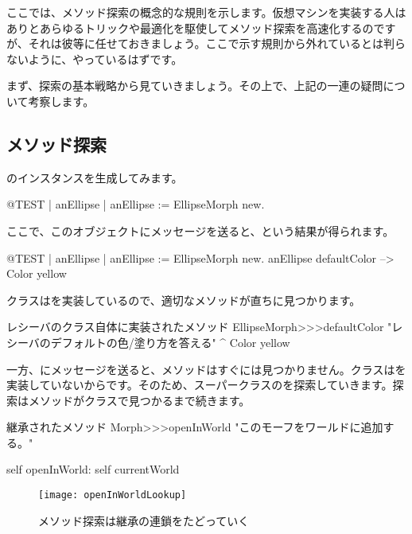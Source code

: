 \documentclass[a4paper,10pt,twoside]{book}
\begin{document}
ここでは、メソッド探索の概念的な規則を示します。仮想マシンを実装する人はありとあらゆるトリックや最適化を駆使してメソッド探索を高速化するのですが、それは彼等に任せておきましょう。ここで示す規則から外れているとは判らないように、やっているはずです。

まず、探索の基本戦略から見ていきましょう。その上で、上記の一連の疑問について考察します。

\subsection{メソッド探索}
のインスタンスを生成してみます。
\begin{code}{@TEST | anEllipse |}
anEllipse := EllipseMorph new.
\end{code}
\noindent
ここで、このオブジェクトにメッセージを送ると、という結果が得られます。
\begin{code}{@TEST | anEllipse | anEllipse := EllipseMorph new.}
anEllipse defaultColor --> Color yellow
\end{code}
\noindent
{}クラスはを実装しているので、適切なメソッドが直ちに見つかります。

\begin{method}[defaultColor]{レシーバのクラス自体に実装されたメソッド}
EllipseMorph>>>defaultColor
	"レシーバのデフォルトの色/塗り方を答える"
	^ Color yellow
\end{method}

一方、にメッセージを送ると、メソッドはすぐには見つかりません。クラスはを実装していないからです。そのため、スーパークラスのを探索していきます。探索はメソッドがクラスで見つかるまで続きます。

\begin{method}[openInWorld]{継承されたメソッド}
Morph>>>openInWorld
	"このモーフをワールドに追加する。"

	self openInWorld: self currentWorld
\end{method}

\begin{figure}[htb]
\begin{center}
	{\texttt{[image: openInWorldLookup]}}
\caption{メソッド探索は継承の連鎖をたどっていく}
\end{center}
\end{figure}
\end{document}
